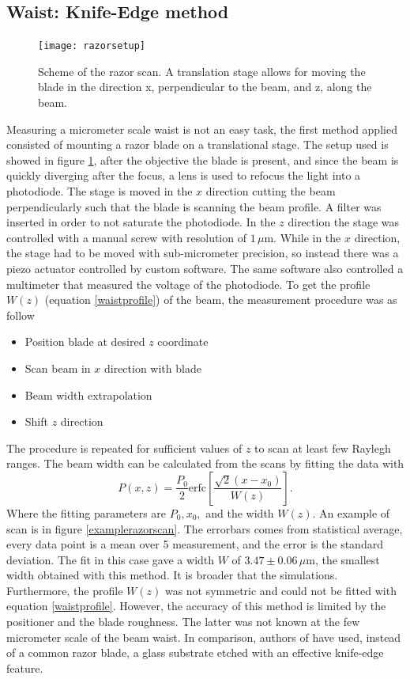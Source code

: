 \subsection{Waist: Knife-Edge method}
\label{sec:knifeedge}
\begin{figure}[H]
\centering
\texttt{[image: razorsetup]}
\caption{Scheme of the razor scan. A translation stage allows for moving the blade in the direction x, perpendicular to the beam, and z, along the beam.}
\label{razorscan}
\end{figure}
Measuring a micrometer scale waist is not an easy task, the first method applied consisted of mounting a razor blade on a translational stage. The setup used is showed in figure \ref{razorscan}, after the objective the blade is present, and since the beam is quickly diverging after the focus, a lens is used to refocus the light into a photodiode. The stage is moved in the $x$ direction cutting the beam perpendicularly such that the blade is scanning the beam profile. A filter was inserted in order to not saturate the photodiode.
In the $z$ direction the stage was controlled with a manual screw with resolution of $1\,\mu$m. While in the $x$ direction, the stage had to be moved with sub-micrometer precision, so instead there was a piezo actuator controlled by custom software. The same software also controlled a multimeter that measured the voltage of the photodiode. To get the profile $W(z)$ (equation \eqref{waistprofile}) of the beam, the measurement procedure was as follow
\begin{itemize}
\item Position blade at desired $z$ coordinate
\item Scan beam in $x$ direction with blade
\item Beam width extrapolation
\item Shift $z$ direction
\end{itemize}
The procedure is repeated for sufficient values of $z$ to scan at least few Raylegh ranges. The beam width can be calculated from the scans by fitting the data with \cite{knifeedge}
\begin{equation}
P(x,z) = \frac{P_0}{2}\text{erfc}\left[\frac{\sqrt{2}(x-x_0)}{W(z)} \right].
\end{equation}
Where the fitting parameters are $P_0, x_0,$ and the width $W(z)$. An example of scan is in figure \ref{examplerazorscan}. The errorbars comes from statistical average, every data point is a mean over 5 measurement, and the error is the standard deviation. The fit in this case gave a width $W$ of $3.47\pm 0.06\,\mu$m, the smallest width obtained with this method. It is broader that the simulations. Furthermore, the profile $W(z)$ was not symmetric and could not be fitted with equation \eqref{waistprofile}. However, the accuracy of this method is limited by the positioner and the blade roughness. The latter was not known at the few micrometer scale of the beam waist. In comparison, authors of \cite{Cannon:86} have used, instead of a common razor blade, a glass substrate etched with an effective knife-edge feature.
